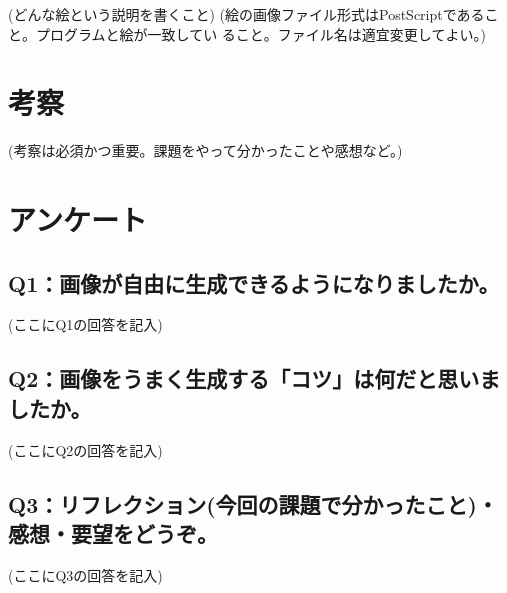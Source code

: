 \documentclass[12pt,a4j]{jarticle}
\begin{document}
(どんな絵という説明を書くこと)
(絵の画像ファイル形式はPostScriptであること。プログラムと絵が一致してい
ること。ファイル名は適宜変更してよい。)
\begin{center}
\end{center}


\section{考察}

(考察は必須かつ重要。課題をやって分かったことや感想など。)

\section{アンケート}

\subsection{Q1：画像が自由に生成できるようになりましたか。}

(ここにQ1の回答を記入)

\subsection{Q2：画像をうまく生成する「コツ」は何だと思いましたか。}

(ここにQ2の回答を記入)

\subsection{Q3：リフレクション(今回の課題で分かったこと)・感想・要望をどうぞ。}

(ここにQ3の回答を記入)
\end{document}
